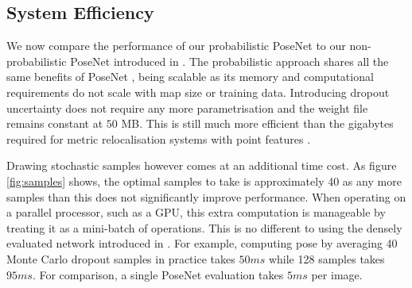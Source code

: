 \subsection{System Efficiency}

We now compare the performance of our probabilistic PoseNet to our non-probabilistic PoseNet introduced in \citep{kendall2015posenet}. The probabilistic approach shares all the same benefits of PoseNet \citep{kendall2015posenet}, being scalable as its memory and computational requirements do not scale with map size or training data. Introducing dropout uncertainty does not require any more parametrisation and the weight file remains constant at $50$ MB. This is still much more efficient than the gigabytes required for metric relocalisation systems with point features \citep{li2012worldwide}.

Drawing stochastic samples however comes at an additional time cost. As figure \ref{fig:samples} shows, the optimal samples to take is approximately 40 as any more samples than this does not significantly improve performance. When operating on a parallel processor, such as a GPU, this extra computation is manageable by treating it as a mini-batch of operations. This is no different to using the densely evaluated network introduced in \citep{kendall2015posenet}. For example, computing pose by averaging 40 Monte Carlo dropout samples in practice takes $50ms$ while 128 samples takes $95ms$. For comparison, a single PoseNet evaluation takes $5ms$ per image.

